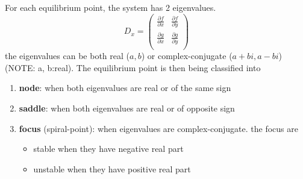 For each equilibrium point, the system has 2 eigenvalues.
\begin{equation}
  \label{eq:647}
  D_x = \left(
    \begin{array}{cc}
      \frac{\partial f}{\partial x} &      \frac{\partial f}{\partial
        y} \\
      \frac{\partial g}{\partial x} &      \frac{\partial g}{\partial
        y} \\
    \end{array}
    \right)
\end{equation}
the eigenvalues can be both real ($a,b$) or complex-conjugate ($a+bi,
a-bi$) (NOTE: a, b:real).
The equilibrium point is then being classified into
\begin{enumerate}
\item {\bf node}: when both eigenvalues are real or of the same sign
\item {\bf saddle}: when both eigenvalues are real or of opposite sign
\item {\bf focus} (spiral-point): when eigenvalues are
  complex-conjugate. the focus are 
  \begin{itemize}
  \item stable when they have negative real part
  \item unstable when they have positive real part
  \end{itemize}
\end{enumerate}

